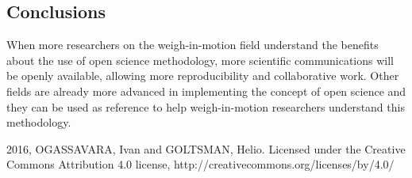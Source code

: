 \documentclass[a0,portrait]{a0poster}
\begin{document}
\begin{multicols}{2}

\color{black} %

\section*{Conclusions}

When more researchers on the weigh-in-motion field understand the benefits about the use of open science methodology, more scientific communications will be openly available, allowing more reproducibility and collaborative work. Other fields are already more advanced in implementing the concept of open science and they can be used as reference to help weigh-in-motion researchers understand this methodology.


\nocite{*} %

\end{multicols}

2016, OGASSAVARA, Ivan and GOLTSMAN, Helio. Licensed under the Creative Commons Attribution 4.0 license, http://creativecommons.org/licenses/by/4.0/
\end{document}
